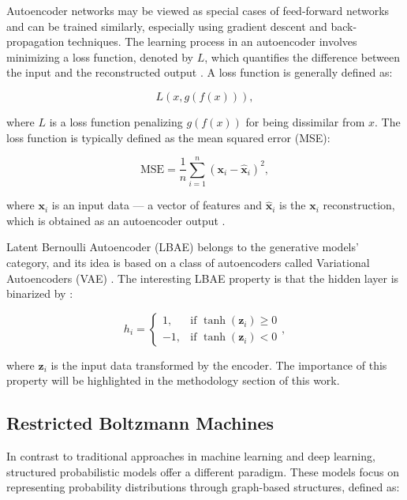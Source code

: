 \documentclass[a4paper,12pt]{article}
\begin{document}
Autoencoder networks may be viewed as special cases of feed-forward networks and can be trained similarly, especially using gradient descent and back-propagation techniques. The learning process in an autoencoder involves minimizing a loss function, denoted by $L$, which quantifies the difference between the input and the reconstructed output \cite{Goodfellow2016}. A loss function is generally defined as:

\begin{equation}\label{loss}
    L(x,g(f(x))),
\end{equation}

\noindent where $L$ is a loss function penalizing  $g(f\left(x\right))$ for being dissimilar from  $x$. The loss function is typically defined as the mean squared error (MSE):

\begin{equation}\label{mse}
    \text{MSE} = \frac{1}{n} \sum_{i=1}^{n} (\mathbf{x}_i - \hat{\mathbf{x}}_i)^2,
\end{equation}

\noindent where $\mathbf{x}_i$ is an input data --- a vector of features and $\hat{\mathbf{x}}_i$ is the $\mathbf{x}_i$ reconstruction, which is obtained as an autoencoder output \cite{Goodfellow2016}.

Latent Bernoulli Autoencoder (LBAE) belongs to the generative models' category, and its idea is based on a class of autoencoders called Variational Autoencoders (VAE) \cite{fajtl2020}. The interesting LBAE property is that the hidden layer is binarized by \cite{fajtl2020}:

\begin{equation}\label{lbae_latent_space}
    h_{i} = 
    \begin{cases}
        1, & \text{if } \tanh(\mathbf{z}_i) \geq 0 \\
        -1, & \text{if } \tanh(\mathbf{z}_i) < 0
    \end{cases},
\end{equation}

\noindent where $\mathbf{z}_i$ is the input data transformed by the encoder. The importance of this property will be highlighted in the methodology section of this work.

\subsection{Restricted Boltzmann Machines}\label{rbm_section}
In contrast to traditional approaches in machine learning and deep learning, structured probabilistic models offer a different paradigm. These models focus on representing probability distributions through graph-based structures, defined as:
\end{document}
